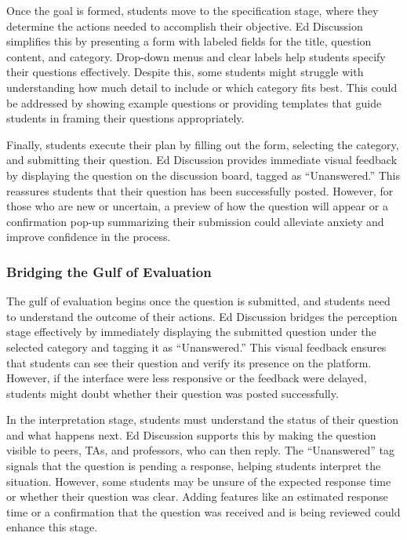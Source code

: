 \documentclass[
	letterpaper, %
]{jdf}
\begin{document}
Once the goal is formed, students move to the specification stage, where they determine the actions needed to accomplish their objective. Ed Discussion simplifies this by presenting a form with labeled fields for the title, question content, and category. Drop-down menus and clear labels help students specify their questions effectively. Despite this, some students might struggle with understanding how much detail to include or which category fits best. This could be addressed by showing example questions or providing templates that guide students in framing their questions appropriately.

Finally, students execute their plan by filling out the form, selecting the category, and submitting their question. Ed Discussion provides immediate visual feedback by displaying the question on the discussion board, tagged as “Unanswered.” This reassures students that their question has been successfully posted. However, for those who are new or uncertain, a preview of how the question will appear or a confirmation pop-up summarizing their submission could alleviate anxiety and improve confidence in the process.

\subsubsection {Bridging the Gulf of Evaluation}
The gulf of evaluation begins once the question is submitted, and students need to understand the outcome of their actions. Ed Discussion bridges the perception stage effectively by immediately displaying the submitted question under the selected category and tagging it as “Unanswered.” This visual feedback ensures that students can see their question and verify its presence on the platform. However, if the interface were less responsive or the feedback were delayed, students might doubt whether their question was posted successfully.

In the interpretation stage, students must understand the status of their question and what happens next. Ed Discussion supports this by making the question visible to peers, TAs, and professors, who can then reply. The “Unanswered” tag signals that the question is pending a response, helping students interpret the situation. However, some students may be unsure of the expected response time or whether their question was clear. Adding features like an estimated response time or a confirmation that the question was received and is being reviewed could enhance this stage.
\end{document}
